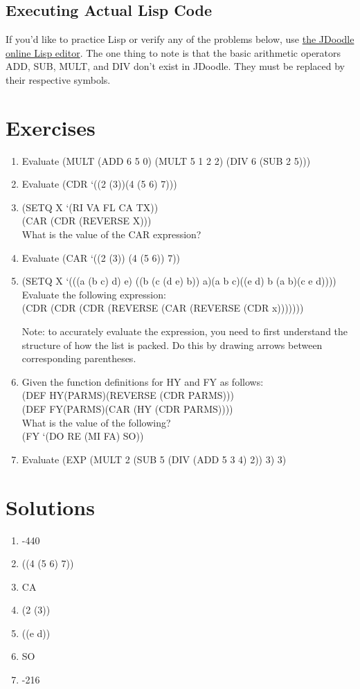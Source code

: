 \documentclass[11pt,letterpaper]{article}
\begin{document}
    \subsection{Executing Actual Lisp Code}
    If you'd like to practice Lisp or verify any of the problems below, use
    \href{https://www.jdoodle.com/execute-clisp-online}{the JDoodle online Lisp editor}.
    The one thing to note is that the basic arithmetic operators ADD, SUB, MULT, and DIV
    don't exist in JDoodle.
    They must be replaced by their respective symbols.

    \newpage
    \section{Exercises}
    \begin{enumerate}
        \item Evaluate (MULT (ADD 6 5 0) (MULT 5 1 2 2) (DIV 6 (SUB 2 5)))
        \item Evaluate (CDR `((2 (3))(4 (5 6) 7)))
        \item (SETQ X `(RI VA FL CA TX))\\
        (CAR (CDR (REVERSE X)))\\
        What is the value of the CAR expression?
        \item Evaluate (CAR `((2 (3)) (4 (5 6)) 7))
        \item (SETQ X `(((a (b c) d) e) ((b (c (d e) b)) a)(a b c)((e d) b (a b)(c e d))))\\
        Evaluate the following expression:\\
        (CDR (CDR (CDR (REVERSE (CAR (REVERSE (CDR x)))))))

        Note: to accurately evaluate the expression,
        you need to first understand the structure
        of how the list is packed.
        Do this by drawing arrows between corresponding parentheses.

        \item Given the function definitions for HY and FY as follows:\\
        (DEF HY(PARMS)(REVERSE (CDR PARMS)))\\
        (DEF FY(PARMS)(CAR (HY (CDR PARMS))))\\
        What is the value of the following?\\
        (FY `(DO RE (MI FA) SO))
        \item Evaluate
        (EXP (MULT 2 (SUB 5 (DIV (ADD 5 3 4) 2)) 3) 3)
    \end{enumerate}

    \newpage
    \section{Solutions}
    \begin{enumerate}
        \item -440
        \item ((4 (5 6) 7))
        \item CA
        \item (2 (3))
        \item ((e d))
        \item SO
        \item -216
    \end{enumerate}
\end{document}

